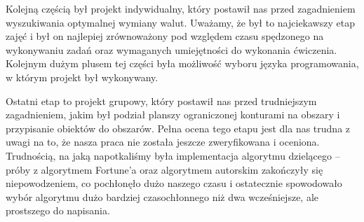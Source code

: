 \documentclass[a4paper,12pt]{article}
\begin{document}
Kolejną częścią był projekt indywidualny, który postawił nas przed zagadnieniem wyszukiwania optymalnej wymiany walut. Uważamy, że był to najciekawszy etap zajęć i był on najlepiej zrównoważony pod względem czasu spędzonego na wykonywaniu zadań oraz wymaganych umiejętności do wykonania ćwiczenia. Kolejnym dużym plusem tej części była możliwość wyboru języka programowania, w którym projekt był wykonywany.

Ostatni etap to projekt grupowy, który postawił nas przed trudniejszym zagadnieniem, jakim był podział planszy ograniczonej konturami na obszary i przypisanie obiektów do obszarów. Pełna ocena tego etapu jest dla nas trudna z uwagi na to, że nasza praca nie została jeszcze zweryfikowana i oceniona. Trudnością, na jaką napotkaliśmy była implementacja algorytmu dzielącego -- próby z algorytmem Fortune'a oraz algorytmem autorskim zakończyły się niepowodzeniem, co pochłonęło dużo naszego czasu i ostatecznie spowodowało wybór algorytmu dużo bardziej czasochłonnego niż dwa wcześniejsze, ale prostszego do napisania.
\end{document}
